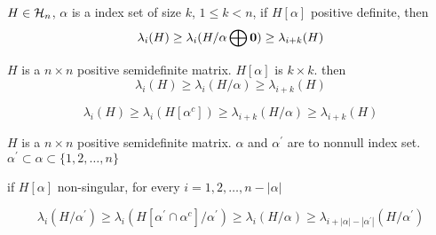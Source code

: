 \begin{lemma}
  $H \in \mathcal{H}_n$, $\alpha$ is a index set of size $k$, $1\leq k<n$,
  if $H[\alpha]$ positive definite,
  then 
  $$
\lambda_i(H) \geq \lambda_i(H/\alpha \bigoplus \mathbf{0})  \geq \lambda_{i+k}(H)
$$
\end{lemma}

\begin{corollary}
  $H$ is a $n \times n$ positive semidefinite matrix.
  $H[\alpha]$ is $k \times k$.
  then 
  $$
\lambda_i(H) \geq \lambda_i(H/\alpha )  \geq \lambda_{i+k}(H)
$$

$$
\lambda_i(H) \geq \lambda_i(H[\alpha^c] )  \geq \lambda_{i+k}(H/\alpha) \geq \lambda_{i+k}(H)
$$
\end{corollary}


\begin{corollary}
  $H$ is a $n \times n$ positive semidefinite matrix.
  $\alpha$ and $\alpha^\prime$ are to nonnull index set.
  $\alpha^\prime \subset \alpha \subset \{1,2,\dots,n\}$

  if $H[\alpha]$ non-singular,
  for every $i  =1,2,\dots,n - |\alpha|$

  $$
  \lambda_i(H/\alpha^\prime)
  \geq 
  \lambda_i(H[\alpha^\prime\cap \alpha^c]/\alpha^\prime)
  \geq
  \lambda_i(H/\alpha)
  \geq 
  \lambda_{i+|\alpha| - |\alpha^\prime|}(H/\alpha^\prime)
  $$
\end{corollary}
